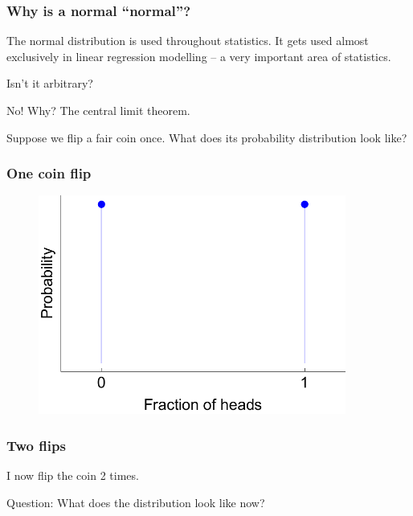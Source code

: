 \documentclass{beamer}
\begin{document}
	\begin{frame}
		\frametitle{Why is a normal ``normal''?}
		
		The normal distribution is used throughout statistics. It gets used almost exclusively in linear regression modelling -- a very important area of statistics.
		
		\vspace{0.5cm}
				
		Isn't it arbitrary?
		
		\vspace{0.5cm}
		
		No! Why? The central limit theorem. 
		
		\vspace{0.5cm}
		
		Suppose we flip a fair coin once. What does its probability distribution look like?
		
	\end{frame}
	
	\begin{frame}
		\frametitle{One coin flip}
		
		\begin{figure}[ht]
			\centerline{\includegraphics[width=0.9\textwidth]{./figures/binomial_1.pdf}}
		\end{figure}
		
	\end{frame}
	
	\begin{frame}
		\frametitle{Two flips}
		I now flip the coin 2 times.
		
		\vspace{0.5cm}
		
		Question: What does the distribution look like now?
		
	\end{frame}
	
\end{document}

